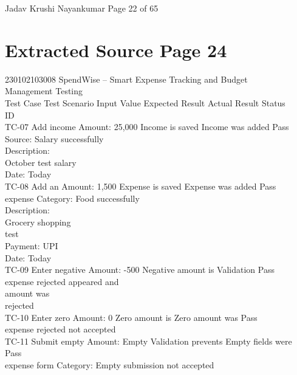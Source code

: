 \documentclass[12pt,a4paper]{report}
\begin{document}
\smallskip

\smallskip
Jadav Krushi Nayankumar                                                           Page 22 of 65\\ 

\clearpage
\section*{Extracted Source Page 24}
230102103008                        SpendWise – Smart Expense Tracking and Budget\\ 
Management Testing\\ 

\smallskip
Test Case Test Scenario Input Value             Expected Result Actual Result             Status\\ 
ID\\ 
TC-07     Add income      Amount: 25,000        Income is saved     Income was added Pass\\ 
Source: Salary                            successfully\\ 
Description:\\ 
October test salary\\ 
Date: Today\\ 
TC-08     Add an          Amount: 1,500         Expense is saved    Expense was added Pass\\ 
expense         Category: Food                            successfully\\ 
Description:\\ 
Grocery shopping\\ 
test\\ 
Payment: UPI\\ 
Date: Today\\ 
TC-09     Enter negative Amount: -500           Negative amount is Validation             Pass\\ 
expense                               rejected            appeared and\\ 
amount was\\ 
rejected\\ 
TC-10     Enter zero      Amount: 0             Zero amount is      Zero amount was       Pass\\ 
expense                               rejected            not accepted\\ 
TC-11     Submit empty Amount: Empty            Validation prevents Empty fields were     Pass\\ 
expense form    Category: Empty       submission          not accepted\\ 
\end{document}

